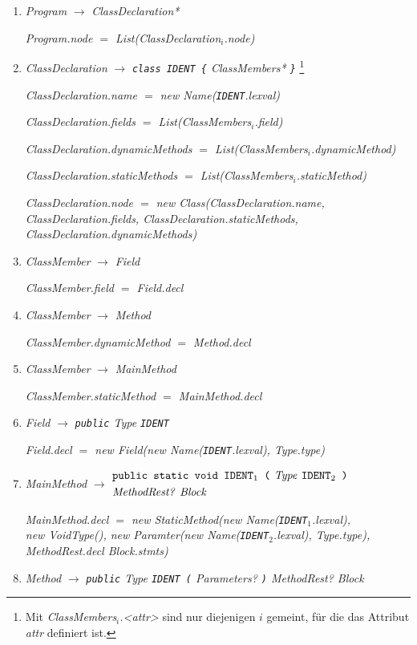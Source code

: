 \documentclass[12pt,a4paper]{scrartcl}
\renewcommand{\prod}[2]{\textit{#1} $\rightarrow$ \textit{#2}}
\newcommand{\tok}[1]{\textnormal{\texttt{#1}}}
\newcommand{\assign}[2]{\textit{#1} $=$ #2}
\newcommand{\List}[1]{\textnormal{List(\textit{#1})}}
\newcommand{\new}[2]{\textnormal{new #1(\textit{#2})}}
\newcommand{\attr}[1]{\parbox{\linewidth}{\raggedleft \textit{#1}}}
\begin{document}
\begin{enumerate}
    \item \prod{Program}{ClassDeclaration*}\\
        \attr{\assign{Program.node}{\List{ClassDeclaration$_i$.node}}}
    \item \prod{ClassDeclaration}{\tok{class IDENT \{} ClassMembers* \tok{\}}}
        \footnote{Mit \textit{ClassMembers$_i$.<attr>} sind nur diejenigen $i$ gemeint, für die das Attribut \textit{attr} definiert ist.}\\
        \attr{\assign{ClassDeclaration.name}{\new{Name}{\tok{IDENT}.lexval}}}
        \attr{\assign{ClassDeclaration.fields}{\List{ClassMembers$_i$.field}}}
        \attr{\assign{ClassDeclaration.dynamicMethods}{\List{ClassMembers$_i$.dynamicMethod}}}
        \attr{\assign{ClassDeclaration.staticMethods}{\List{ClassMembers$_i$.staticMethod}}}
        \attr{\assign{ClassDeclaration.node}{\new{Class}{ClassDeclaration.name, ClassDeclaration.fields, ClassDeclaration.staticMethods, ClassDeclaration.dynamicMethods}}}
    \item \prod{ClassMember}{Field}\\
        \attr{\assign{ClassMember.field}{Field.decl}}
    \item \prod{ClassMember}{Method}\\
        \attr{\assign{ClassMember.dynamicMethod}{Method.decl}}
    \item \prod{ClassMember}{MainMethod}\\
        \attr{\assign{ClassMember.staticMethod}{MainMethod.decl}}
    \item \prod{Field}{\tok{public} Type \tok{IDENT}}\\
        \attr{\assign{Field.decl}{\new{Field}{\new{Name}{\tok{IDENT}.lexval}, Type.type}}}
    \item \textit{MainMethod} $\rightarrow$
        $\begin{aligned} &\textit{\tok{public static void IDENT$_1$ (} Type \tok{IDENT$_2$ )}} \\
                         &\textit{MethodRest? Block} \end{aligned}$\\
        \attr{\assign{MainMethod.decl}{\new{StaticMethod}{\new{Name}{\tok{IDENT$_1$}.lexval}, \\\new{VoidType}{}, \new{Paramter}{\new{Name}{\tok{IDENT}$_2$.lexval}, Type.type}, MethodRest.decl Block.stmts}}}
    \item \prod{Method}{\tok{public} Type \tok{IDENT (} Parameters? \tok{)} MethodRest? Block}

\end{enumerate}
\end{document}
